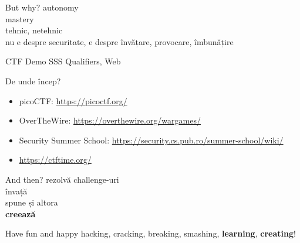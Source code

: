 \documentclass{simple}
\begin{document}
\begin{frame}{But why?}
  \centering
  \pause
  \vspace{0.5cm}
  \Large{autonomy} \\
  \pause
  \vspace{0.5cm}
  \Large{mastery} \\
  \pause
  \vspace{0.5cm}
  \Large{tehnic, netehnic} \\
  \pause
  \vspace{0.5cm}
  \Large{nu e despre securitate, e despre învățare, provocare, îmbunățire}
\end{frame}

\begin{frame}{CTF Demo}
  \centering
  SSS Qualifiers, Web
\end{frame}

\begin{frame}{De unde încep?}
  \begin{itemize}
    \item picoCTF: \url{https://picoctf.org/}
    \item OverTheWire: \url{https://overthewire.org/wargames/}
    \item Security Summer School: \url{https://security.cs.pub.ro/summer-school/wiki/}
    \item \url{https://ctftime.org/}
  \end{itemize}
\end{frame}

\begin{frame}{And then?}
  \centering
  \pause
  \vspace{0.5cm}
  \Large{rezolvă challenge-uri} \\
  \pause
  \vspace{0.5cm}
  \Large{învață} \\
  \pause
  \vspace{0.5cm}
  \Large{spune și altora} \\
  \pause
  \vspace{0.5cm}
  \Large{\textbf{creează}}
\end{frame}

\begin{frame}{}
  \centering
  \LARGE
  Have fun and happy hacking, cracking, breaking, smashing, \textbf{learning}, \textbf{creating}!
\end{frame}
\end{document}
